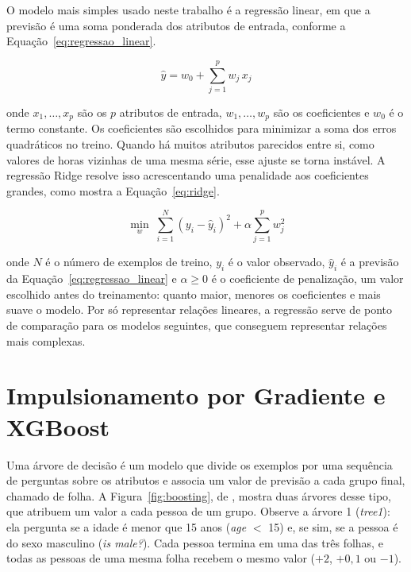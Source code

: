 O modelo mais simples usado neste trabalho é a regressão linear, em que a previsão é uma soma ponderada dos atributos de entrada, conforme a Equação~\ref{eq:regressao_linear}.

\begin{equation}
    \hat{y} = w_0 + \sum_{j=1}^{p} w_j\,x_j
    \label{eq:regressao_linear}
\end{equation}

\noindent onde \(x_1,\ldots,x_p\) são os \(p\) atributos de entrada, \(w_1,\ldots,w_p\) são os coeficientes e \(w_0\) é o termo constante. Os coeficientes são escolhidos para minimizar a soma dos erros quadráticos no treino. Quando há muitos atributos parecidos entre si, como valores de horas vizinhas de uma mesma série, esse ajuste se torna instável. A regressão Ridge \cite{hoerl1970ridge} resolve isso acrescentando uma penalidade aos coeficientes grandes, como mostra a Equação~\ref{eq:ridge}.

\begin{equation}
    \min_{w}\;\sum_{i=1}^{N}\left(y_i-\hat{y}_i\right)^2+\alpha\sum_{j=1}^{p}w_j^2
    \label{eq:ridge}
\end{equation}

\noindent onde \(N\) é o número de exemplos de treino, \(y_i\) é o valor observado, \(\hat{y}_i\) é a previsão da Equação~\ref{eq:regressao_linear} e \(\alpha\geq 0\) é o coeficiente de penalização, um valor escolhido antes do treinamento: quanto maior, menores os coeficientes e mais suave o modelo. Por só representar relações lineares, a regressão serve de ponto de comparação para os modelos seguintes, que conseguem representar relações mais complexas.

\section{Impulsionamento por Gradiente e XGBoost}
\label{sec:xgboost}

Uma árvore de decisão é um modelo que divide os exemplos por uma sequência de perguntas sobre os atributos e associa um valor de previsão a cada grupo final, chamado de folha. A Figura~\ref{fig:boosting}, de , mostra duas árvores desse tipo, que atribuem um valor a cada pessoa de um grupo. Observe a árvore 1 (\textit{tree1}): ela pergunta se a idade é menor que 15 anos (\textit{age} \(<\) 15) e, se sim, se a pessoa é do sexo masculino (\textit{is male?}). Cada pessoa termina em uma das três folhas, e todas as pessoas de uma mesma folha recebem o mesmo valor (\(+2\), \(+0{,}1\) ou \(-1\)).

